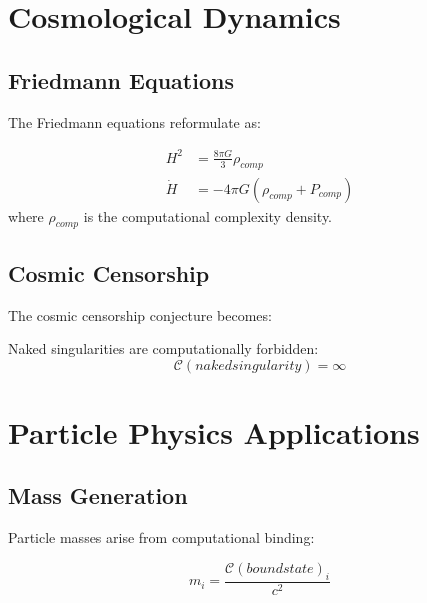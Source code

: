 \documentclass[12pt,a4paper]{article}
\newcommand{\comp}[1]{\mathcal{C}(#1)}
\begin{document}
\section{Cosmological Dynamics}

\subsection{Friedmann Equations}

The Friedmann equations reformulate as:

\begin{theorem}
\begin{align}
H^2 &= \frac{8\pi G}{3}\rho_{comp} \\
\dot{H} &= -4\pi G(\rho_{comp} + P_{comp})
\end{align}
where $\rho_{comp}$ is the computational complexity density.
\end{theorem}

\subsection{Cosmic Censorship}

The cosmic censorship conjecture becomes:

\begin{proposition}
Naked singularities are computationally forbidden:
\begin{equation}
\comp{naked singularity} = \infty
\end{equation}
\end{proposition}

\section{Particle Physics Applications}

\subsection{Mass Generation}

Particle masses arise from computational binding:

\begin{theorem}
\begin{equation}
m_i = \frac{\comp{bound state}_i}{c^2}
\end{equation}
\end{theorem}
\end{document}
